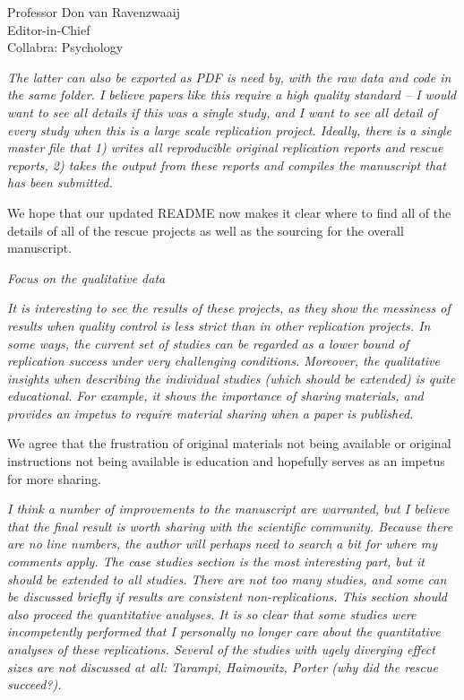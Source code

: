 \documentclass{stanfordletter}
\newcommand{\theysaid}[1]{\begin{leftbar} \noindent 
		\textsl{ #1}\end{leftbar}}
\begin{document}
\begin{letter}{Professor Don van Ravenzwaaij \\ Editor-in-Chief \\ Collabra: Psychology }
		\theysaid{ The latter can also be exported as PDF is need by, with the raw data and code in the same folder. I believe papers like this require a high quality standard – I would want to see all details if this was a single study, and I want to see all detail of every study when this is a large scale replication project. Ideally, there is a single master file that 1) writes all reproducible original replication reports and rescue reports, 2) takes the output from these reports and compiles the manuscript that has been submitted.}
		
		We hope that our updated README now makes it clear where to find all of the details of all of the rescue projects as well as the sourcing for the overall manuscript. 
		
		
		\theysaid{Focus on the qualitative data}
		\theysaid{It is interesting to see the results of these projects, as they show the messiness of results when quality control is less strict than in other replication projects. In some ways, the current set of studies can be regarded as a lower bound of replication success under very challenging conditions. Moreover, the qualitative insights when describing the individual studies (which should be extended) is quite educational. For example, it shows the importance of sharing materials, and provides an impetus to require material sharing when a paper is published.}
		
		We agree that the frustration of original materials not being available or original instructions not being available is education and hopefully serves as an impetus for more sharing. 
		
		\theysaid{ I think a number of improvements to the manuscript are warranted, but I believe that the final result is worth sharing with the scientific community. Because there are no line numbers, the author will perhaps need to search a bit for where my comments apply.
		The case studies section is the most interesting part, but it should be extended to all studies.
		 There are not too many studies, and some can be discussed briefly if results are consistent non-replications. This section should also proceed the quantitative analyses. It is so clear that some studies were incompetently performed that I personally no longer care about the quantitative analyses of these replications. Several of the studies with ugely diverging effect sizes are not discussed at all: Tarampi, Haimowitz, Porter (why did the rescue succeed?).}
		 

\end{letter}
\end{document}
